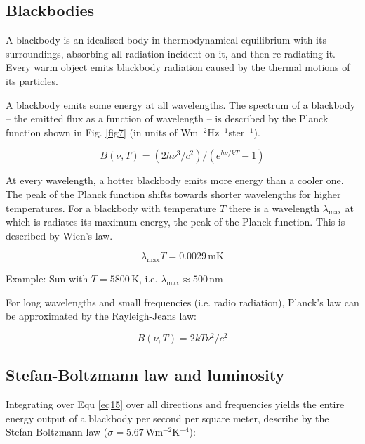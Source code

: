 \subsection{Blackbodies}

A blackbody is an idealised body in thermodynamical equilibrium with its surroundings, absorbing all radiation incident on it, and then re-radiating it. Every warm object emits blackbody radiation caused by the thermal motions of its particles.

A blackbody emits some energy at all wavelengths. The spectrum of a blackbody -- the emitted flux as a function of wavelength -- is described by the Planck function shown in Fig. \ref{fig7} (in units of Wm$^{-2}$Hz$^{-1}$ster$^{-1}$).

\begin{equation}
B(\nu,T) = (2h\nu^3/c^2) / (e^{h\nu/kT} - 1)
\label{eq15}
\end{equation}

At every wavelength, a hotter blackbody emits more energy than a cooler one. The peak of the Planck function shifts towards shorter wavelengths for higher temperatures. For a blackbody with temperature $T$ there is a wavelength $\lambda_{\mathrm{max}}$ at which is radiates its maximum energy, the peak of the Planck function. This is described by Wien's law. 

\begin{equation}
\lambda_{\mathrm{max}} T = 0.0029\,\mathrm{m K}
\label{eq16}
\end{equation}

Example: Sun with $T = 5800$\,K, i.e. $\lambda_{\mathrm{max}} \approx 500$\,nm

For long wavelengths and small frequencies (i.e. radio radiation), Planck's law can be approximated by the Rayleigh-Jeans law:

\begin{equation}
B(\nu,T) = 2kT \nu^2 / c^2
\label{eq17}
\end{equation}

\subsection{Stefan-Boltzmann law and luminosity}

Integrating over Equ \eqref{eq15} over all directions and frequencies yields the entire energy output of a blackbody per second per square meter, describe by the Stefan-Boltzmann law ($\sigma = 5.67$\,Wm$^{-2}$K$^{-4}$):

